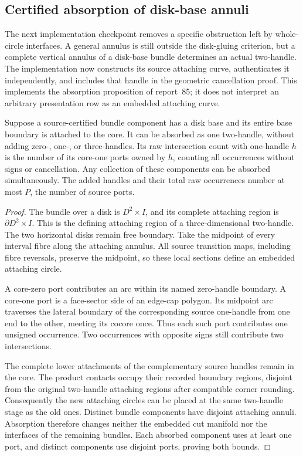\subsection{Certified absorption of disk-base annuli}
\label{marked-cut:disk-absorption}

The next implementation checkpoint removes a specific obstruction left by
whole-circle interfaces. A general annulus is still outside the disk-gluing
criterion, but a complete vertical annulus of a disk-base bundle determines
an actual two-handle. The implementation now constructs its source attaching
curve, authenticates it independently, and includes that handle in the
geometric cancellation proof. This implements the absorption proposition of
report~85; it does not interpret an arbitrary presentation row
as an embedded attaching curve.

\begin{proposition}
\label{marked-cut:absorbed-core}
Suppose a source-certified bundle component has a disk base and its entire
base boundary is attached to the core. It can be absorbed as one two-handle,
without adding zero-, one-, or three-handles. Its raw intersection count with
one-handle $h$ is the number of its core-one ports owned by $h$, counting
all occurrences without signs or cancellation. Any collection of these
components can be absorbed simultaneously. The added handles and their total
raw occurrences number at most $P$, the number of source ports.
\end{proposition}
\begin{proof}
The bundle over a disk is $D^2\times I$, and its complete attaching region
is $\partial D^2\times I$. This is the defining attaching region of a
three-dimensional two-handle. The two horizontal disks remain free boundary.
Take the midpoint of every interval fibre along the attaching annulus.
All source transition maps, including fibre reversals, preserve the midpoint,
so these local sections define an embedded attaching circle.

A core-zero port contributes an arc within its named zero-handle boundary.
A core-one port is a face-sector side of an edge-cap polygon. Its midpoint
arc traverses the lateral boundary of the corresponding source one-handle
from one end to the other, meeting its cocore once. Thus each such port
contributes one unsigned occurrence. Two occurrences with opposite signs
still contribute two intersections.

The complete lower attachments of the complementary source handles remain
in the core. The product contacts occupy their recorded boundary regions,
disjoint from the original two-handle attaching regions after compatible
corner rounding. Consequently the new attaching circles can be placed at
the same two-handle stage as the old ones. Distinct bundle components have
disjoint attaching annuli. Absorption therefore changes neither the embedded
cut manifold nor the interfaces of the remaining bundles. Each absorbed
component uses at least one port, and distinct components use disjoint
ports, proving both bounds.
\end{proof}

